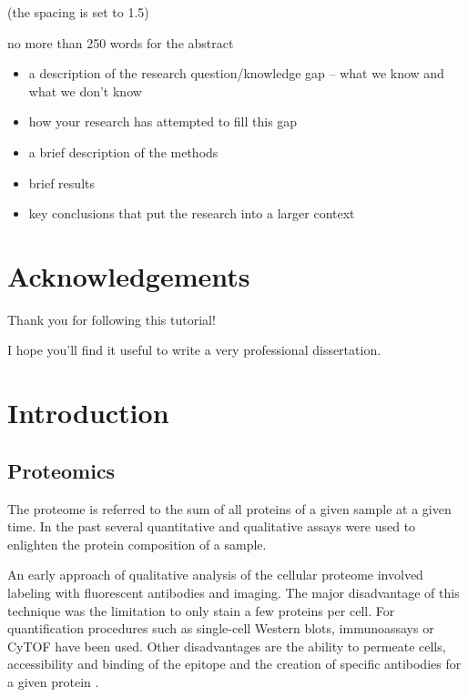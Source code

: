 \documentclass[
  11pt,
]{article}
\providecommand{\tightlist}{%
  \setlength{\itemsep}{0pt}\setlength{\parskip}{0pt}}
\begin{document}

(the spacing is set to 1.5)

no more than 250 words for the abstract

\begin{itemize}
\tightlist
\item
  a description of the research question/knowledge gap -- what we know
  and what we don't know
\item
  how your research has attempted to fill this gap
\item
  a brief description of the methods
\item
  brief results
\item
  key conclusions that put the research into a larger context
\end{itemize}


\newpage

\centering
\raggedright
\newpage
\tableofcontents

\newpage

\section*{Acknowledgements}

Thank you for following this tutorial!

I hope you'll find it useful to write a very professional dissertation.

\newpage

\hypertarget{introduction}{%
\section{Introduction}\label{introduction}}

\hypertarget{proteomics}{%
\subsection{Proteomics}\label{proteomics}}

The proteome is referred to the sum of all proteins of a given sample at
a given time. In the past several quantitative and qualitative assays
were used to enlighten the protein composition of a sample.

An early approach of qualitative analysis of the cellular proteome
involved labeling with fluorescent antibodies and imaging. The major
disadvantage of this technique was the limitation to only stain a few
proteins per cell. For quantification procedures such as single-cell
Western blots, immunoassays or CyTOF have been used. Other disadvantages
are the ability to permeate cells, accessibility and binding of the
epitope and the creation of specific antibodies for a given protein
\citep{Budnik2018}.
\end{document}
